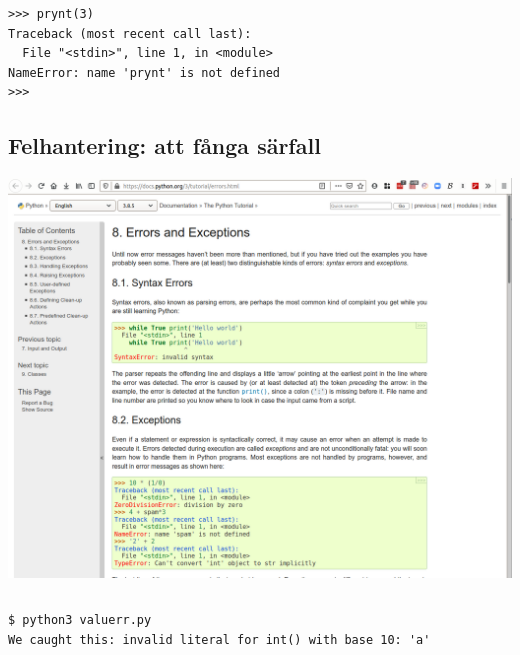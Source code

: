 \begin{frame}[fragile]
  \begin{example}
    \begin{verbatim}
>>> prynt(3)
Traceback (most recent call last):
  File "<stdin>", line 1, in <module>
NameError: name 'prynt' is not defined
>>> 
    \end{verbatim}
  \end{example}
\end{frame}

\subsection{Felhantering: att fånga särfall}

\begin{frame}
  \includegraphics[width=\columnwidth]{figs/docs-except.png}
\end{frame}

\begin{frame}[fragile]
  \begin{example}
    \inputminted{python}{examples/valuerr.py}
  \end{example}

  \pause

  \begin{example}
    \begin{verbatim}
$ python3 valuerr.py
We caught this: invalid literal for int() with base 10: 'a'
    \end{verbatim}
  \end{example}
\end{frame}

